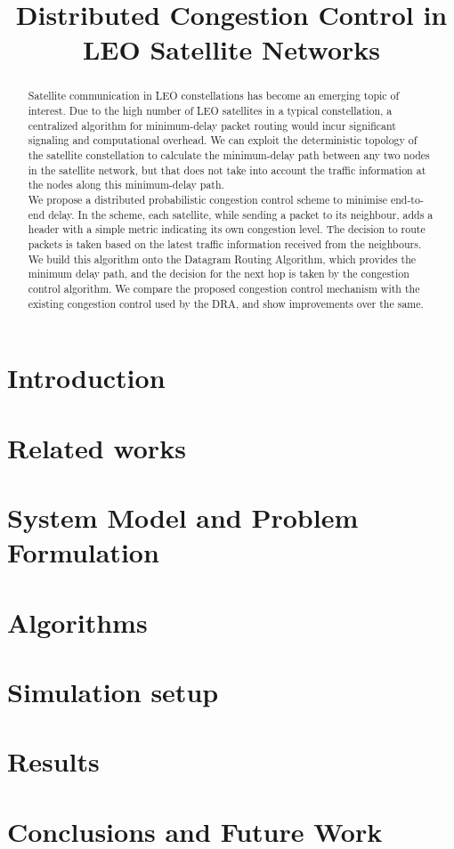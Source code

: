 \documentclass[10pt,conference, draft, letterpaper]{IEEEtran}
\title{Distributed Congestion Control in LEO Satellite Networks}
\begin{document}
\maketitle	
	\begin{abstract}
Satellite communication in LEO constellations has become an emerging topic of interest. Due to the high number of LEO satellites in a typical constellation, a centralized algorithm for minimum-delay packet routing would incur significant signaling and computational overhead. We can exploit the deterministic topology of the satellite constellation to calculate the minimum-delay path between any two nodes in the satellite network, but that does not take into account the traffic information at the nodes along this minimum-delay path.\\
We propose a distributed probabilistic congestion control scheme to minimise end-to-end delay. In the scheme, each satellite, while sending a packet to its neighbour, adds a header with a simple metric indicating its own congestion level. The decision to route packets is taken based on the latest traffic information received from the neighbours. We build this algorithm onto the Datagram Routing Algorithm, which provides the minimum delay path, and the decision for the next hop is taken by the congestion control algorithm. We compare the proposed congestion control mechanism with the existing congestion control used by the DRA, and show improvements over the same.
	\end{abstract}
\section{Introduction}
\section{Related works}
\section{System Model and Problem Formulation}
\section{Algorithms}
\section{Simulation setup}
\section{Results}
\section{Conclusions and Future Work}
\end{document}
